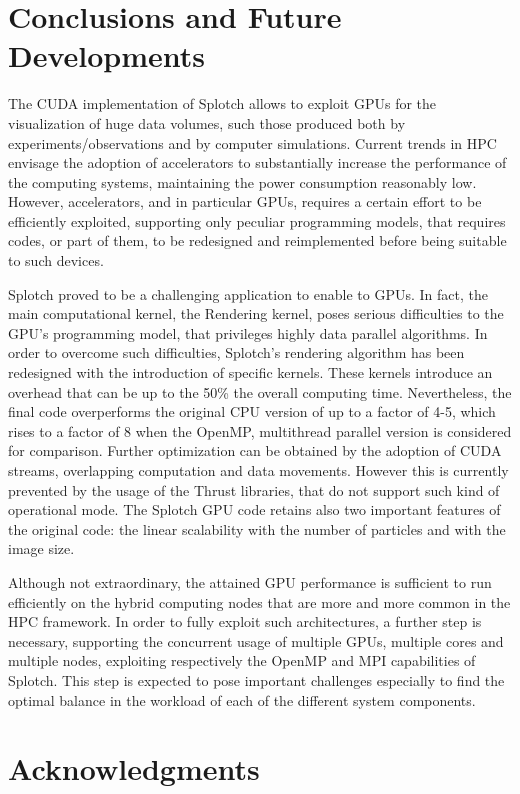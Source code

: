 \documentclass[1p]{elsarticle}
\begin{document}


\section{Conclusions and Future Developments}
\label{sec:conclusions}
The CUDA implementation of Splotch allows to exploit GPUs 
for the visualization of huge data volumes, such those produced both 
by experiments/observations and by computer simulations. Current trends
in HPC envisage the adoption of accelerators to substantially 
increase the performance of the computing systems, maintaining the power
consumption reasonably low. However, accelerators, and in particular 
GPUs, requires a certain effort to be efficiently exploited, 
supporting only peculiar programming models, that requires codes, or part
of them, to be redesigned and reimplemented before being suitable to such devices. 

Splotch proved to be a challenging application to enable to GPUs. 
In fact, the main computational kernel, the Rendering kernel, poses serious difficulties
to the GPU's programming model, that privileges highly data parallel algorithms.
In order to overcome such difficulties, Splotch's rendering algorithm has been
redesigned with the introduction of specific kernels. These kernels 
introduce an overhead that can be up to the 50\% the overall computing
time. Nevertheless, the final code overperforms the original CPU
version of up to a factor of 4-5, which rises to a factor of 8 when the OpenMP,
multithread parallel version is considered for comparison. Further optimization can
be obtained by the adoption of CUDA streams, overlapping computation 
and data movements. However this is currently prevented by the usage of the 
Thrust libraries, that do not support such kind of operational mode. 
The Splotch GPU code retains also two important features of the original
code: the linear scalability with the number of particles and with the 
image size. 

Although not extraordinary, the attained GPU performance is sufficient 
to run efficiently on the hybrid computing nodes that are more and 
more common in the HPC framework. In order to fully exploit such architectures, 
a further step is necessary, supporting the concurrent usage of 
multiple GPUs, multiple cores and multiple nodes, exploiting respectively the OpenMP and
MPI capabilities of Splotch. This step is expected to pose important 
challenges especially to find the optimal balance in the workload of each of the different 
system components.

\section*{Acknowledgments}


	
\end{document}
